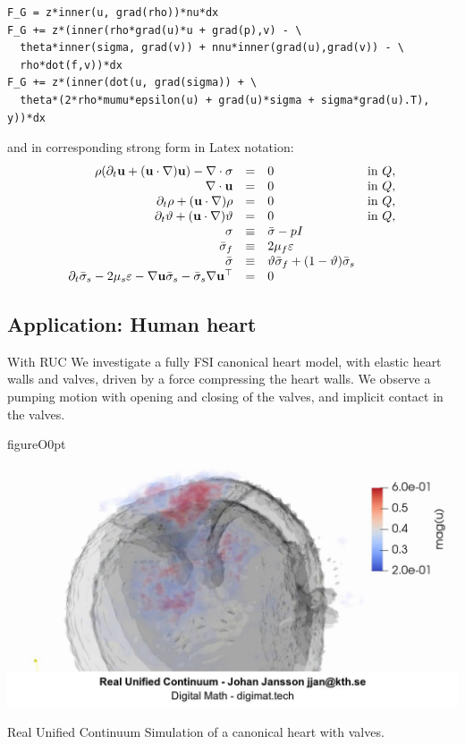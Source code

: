 \begin{lstlisting}
F_G = z*inner(u, grad(rho))*nu*dx
F_G += z*(inner(rho*grad(u)*u + grad(p),v) - \
  theta*inner(sigma, grad(v)) + nnu*inner(grad(u),grad(v)) - \
  rho*dot(f,v))*dx
F_G += z*(inner(dot(u, grad(sigma)) + \
  theta*(2*rho*mumu*epsilon(u) + grad(u)*sigma + sigma*grad(u).T), y))*dx
\end{lstlisting}

and in corresponding strong form in Latex notation:	  
\begin{equation*} %
      \begin{array}{rcll} 
	    \rho (\partial_t {\bf u} + ({\bf u} \cdot \nabla) {\bf u}) - \nabla \cdot \sigma &=& 0
      \,\, &\mbox{in } Q,\\ 
	    \nabla \cdot {\bf u} &=& 0  \,\, &\mbox{in }Q,\\
	    \partial_t \rho + ({\bf u} \cdot \nabla) \rho &=& 0  \,\, &\mbox{in }Q,\\
	    \partial_t \theta + ({\bf u} \cdot \nabla) \theta &=& 0  \,\, &\mbox{in }Q,\\
            \sigma &\equiv& \bar{\sigma} - pI\\
            \bar{\sigma}_f &\equiv& 2\mu_f \epsilon\\
            \bar{\sigma} &\equiv& \theta \bar{\sigma}_f + (1 - \theta) \bar{\sigma}_s\\
            \partial_t \bar{\sigma}_s - 2\mu_s \epsilon - \nabla {\bf u} \bar{\sigma}_s - \bar{\sigma}_s \nabla {\bf u}^{\top} &=& 0
      \end{array} 
\end{equation*}   

\subsection{Application: Human heart}

With RUC We investigate a fully FSI canonical heart model, with
elastic heart walls and valves, driven by a force compressing the
heart walls. We observe a pumping motion with opening and closing of
the valves, and implicit contact in the valves.

\begin{wrapfloat}{figure}{O}{0pt}
  \centering
    \includegraphics[width=0.5\columnwidth]{img/RealUnifiedContinuum-h107-heart-transparent-valves01.jpg}
    \caption{Real Unified Continuum Simulation of a canonical heart with valves.}
    \label{fig_rfa_catheter}
\end{wrapfloat}


